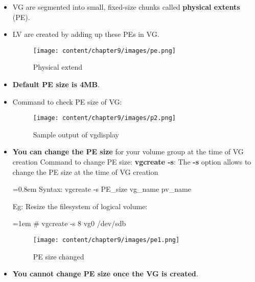\setlength{\columnsep}{3pt}
\begin{flushleft}
	
	\begin{itemize}
		\item VG are segmented into small, fixed-size chunks called \textbf{physical extents} (PE).
		\item LV are created by adding up these PEs in VG.
		\begin{figure}[h!]
			\centering
			\texttt{[image: content/chapter9/images/pe.png]}
			\caption{Physical extend}
			\label{fig:pe_le}
		\end{figure}	
		\item \textbf{Default PE size is 4MB}.
		\item Command to check PE size of VG:
		\begin{figure}[h!]
			\centering
			\texttt{[image: content/chapter9/images/p2.png]}
			\caption{Sample output of vgdisplay}
			\label{fig:PE size}
		\end{figure}
		\newpage
		\item \textbf{You can change the PE size} for your volume group at the time of VG creation
		\newline
		Command to change PE size:
		\newline
		\textbf{vgcreate -s}: The \textbf{-s} option allows to change the PE size at the time of VG creation
		\bigskip 
		\begin{tcolorbox}[breakable,notitle,boxrule=-0pt,colback=pink,colframe=pink]
			\color{black}
			\font=0.8em
			Syntax: vgcreate -s PE\_size vg\_name pv\_name
			\font=4pt
		\end{tcolorbox}
		
		Eg: Resize the filesystem of logical volume:
		\begin{tcolorbox}[breakable,notitle,boxrule=-0pt,colback=black,colframe=black]
			\color{green}
			\font=1em
			\# vgcreate -s 8 vg0 /dev/sdb
			\font=4pt
		\end{tcolorbox}
		\begin{figure}[h!]
			\centering
			\texttt{[image: content/chapter9/images/pe1.png]}
			\caption{PE size changed}
			\label{fig:PE size4}
		\end{figure}
	
		
		\item \textbf{You cannot change PE size once the VG is created}.
		
	\end{itemize}



\end{flushleft}

\newpage


